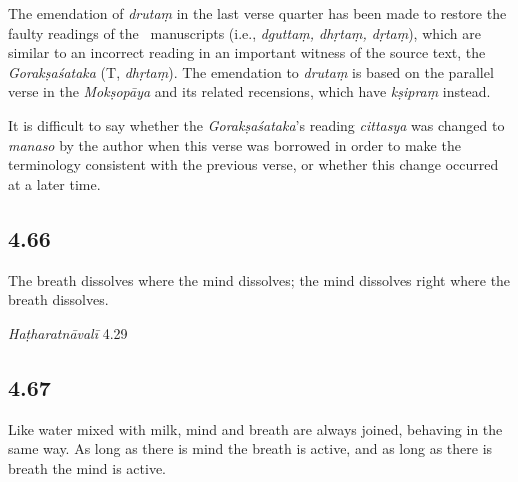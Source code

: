 \begin{ekdosis}
\begin{philcomm}[hp04_065]
The emendation of \emph{drutaṃ} in the last verse quarter has been made to restore the faulty readings of the \textalpha\ manuscripts (i.e., \emph{dguttaṃ, dhṛtaṃ, dṛtaṃ}), which are similar to an incorrect reading in an important witness of the source text, the \emph{Gorakṣaśataka} (T, \emph{dhṛtaṃ}). The emendation to \emph{drutaṃ} is based on the parallel verse in the \emph{Mokṣopāya} and its related recensions, which have \emph{kṣipraṃ} instead.

It is difficult to say whether the \emph{Gorakṣaśataka}'s reading \emph{cittasya} was changed to \emph{manaso} by the author when this verse was borrowed in order to make the terminology consistent with the previous verse, or whether this change occurred at a later time.
\end{philcomm}

\subsection*{4.66}
\begin{translation}[hp04_066]
The breath dissolves where the mind dissolves; the mind dissolves right where the breath dissolves.
\end{translation}


\begin{testimonia}[hp04_066]
\emph{Haṭharatnāvalī} 4.29
\begin{versinnote}
\end{versinnote}
\end{testimonia}

\begin{philcomm}[hp04_066]
\end{philcomm}

\subsection*{4.67}
\begin{translation}[hp04_067]
 Like water mixed with milk, mind and breath are always joined, behaving in the same way.  As long as there is mind the breath is active, and as long as there is breath the mind is active.
\end{translation}



\end{ekdosis}
